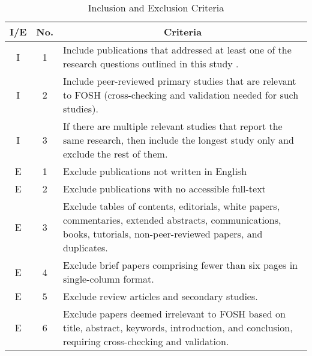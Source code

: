 \documentclass[final-report.tex]{subfiles}
\begin{document}
\begin{table}[htbp]
\centering
\caption{Inclusion and Exclusion Criteria}
\begin{tabular}{|c|c|p{6.5cm}|}
\hline
\textbf{I/E} & \textbf{No.} & \multicolumn{1}{c|}{\textbf{Criteria}} \\
\hline
I & 1 & Include publications that addressed at least one of the research questions outlined in this study . \\
\hline
I & 2 & Include peer-reviewed primary studies that are relevant to FOSH (cross-checking and validation needed for such studies). \\
\hline
I & 3 & If there are multiple relevant studies that report the same research, then include the longest study only and exclude the rest of them. \\
\hline
E & 1 & Exclude publications not written in English \\
\hline
E & 2 & Exclude publications with no accessible full-text\\
\hline
E & 3 & Exclude tables of contents, editorials, white papers, commentaries, extended abstracts, communications, books, tutorials, non-peer-reviewed papers, and duplicates. \\
\hline
E & 4 & Exclude brief papers comprising fewer than six pages in single-column format. \\
\hline
E & 5 & Exclude review articles and secondary studies. \\
\hline
E & 6 & Exclude papers deemed irrelevant to FOSH based on title, abstract, keywords, introduction, and conclusion, requiring cross-checking and validation. \\
\hline
\end{tabular}
\label{tab:criteria}
\end{table}
\end{document}
